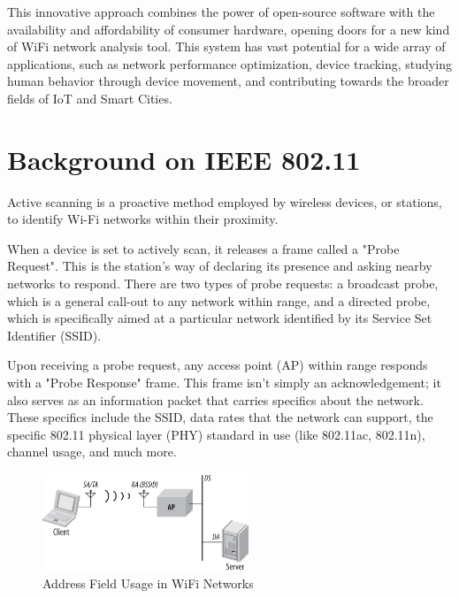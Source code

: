 \documentclass{article}
\begin{document}
This innovative approach combines the power of open-source software with the availability and affordability of consumer hardware, opening doors for a new kind of WiFi network analysis tool. This system has vast potential for a wide array of applications, such as network performance optimization, device tracking, studying human behavior through device movement, and contributing towards the broader fields of IoT and Smart Cities.



\section{Background on IEEE 802.11}

\begin{info}
    Active scanning is a proactive method employed by wireless devices, or stations, to identify Wi-Fi networks within their proximity.
\end{info}

When a device is set to actively scan, it releases a frame called a "Probe Request". This is the station's way of declaring its presence and asking nearby networks to respond. There are two types of probe requests: a broadcast probe, which is a general call-out to any network within range, and a directed probe, which is specifically aimed at a particular network identified by its Service Set Identifier (SSID).

Upon receiving a probe request, any access point (AP) within range responds with a "Probe Response" frame. This frame isn't simply an acknowledgement; it also serves as an information packet that carries specifics about the network. These specifics include the SSID, data rates that the network can support, the specific 802.11 physical layer (PHY) standard in use (like 802.11ac, 802.11n), channel usage, and much more. 

\begin{figure}[h]
    \centering
    \includegraphics[width=0.55\textwidth]{assets/address-field-usage.png}
    \caption{Address Field Usage in WiFi Networks}
    \label{fig:address-field}
\end{figure}
\end{document}
